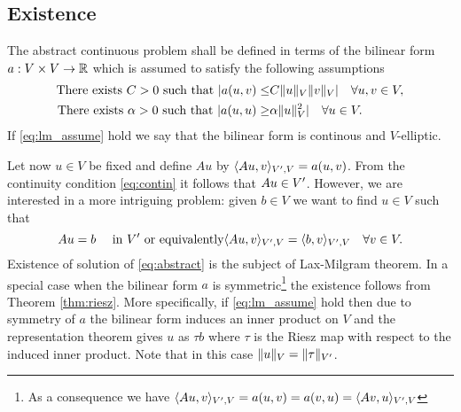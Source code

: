 \subsection{Existence}
  The abstract continuous problem shall be defined in terms of the bilinear form
  $a:V\times V\rightarrow \mathbb{R}$ which is assumed to satisfy the following
  assumptions
  \begin{subequations}\label{eq:lm_assume}
  \begin{align}
    \label{eq:contin}
    \mbox{There exists } C > 0 \mbox{ such that } \lvert a(u, v)\leq &C\lVert u\rVert_V\lVert v\rVert_V\rvert
    \quad\forall u, v\in V, \\
    \label{eq:coerc}
    \mbox{There exists }\alpha > 0 \mbox{ such that } \lvert a(u, u)\geq &\alpha\lVert u\rVert^2_V\rvert
    \quad\forall u\in V.
  \end{align}
  \end{subequations}
  If \eqref{eq:lm_assume} hold we say that the bilinear form is continous and
  $V$-elliptic.

  Let now $u\in V$ be fixed and define $Au$ by $\langle Au, v\rangle_{V^{\prime}, V}=a(u, v)$. 
  From the continuity condition \eqref{eq:contin} it follows that
  $Au\in V^{\prime}$. However, we are interested in a more intriguing problem: given
  $b\in V$ we want to find $u\in V$ such that
  \begin{equation}\label{eq:abstract}
    Au = b\quad\mbox{ in }V^{\prime}
    \mbox{ or equivalently}
    \langle Au, v\rangle_{V^{\prime}, V} = \langle b, v\rangle_{V^{\prime}, V}\quad\forall v\in V.
  \end{equation}
  Existence of solution of \eqref{eq:abstract} is the subject of Lax-Milgram
  theorem. In a special case when the bilinear form $a$ is symmetric\footnote{As a
  consequence we have 
  $\langle Au, v\rangle_{V^{\prime}, V}=a(u, v)=a(v, u) = \langle Av, u\rangle_{V^{\prime}, V}$} the
  existence follows from Theorem \ref{thm:riesz}. More specifically, if
  \eqref{eq:lm_assume} hold then due to symmetry of $a$ the bilinear form induces
  an inner product on $V$ and the representation theorem gives $u$ as $\tau b$
  where $\tau$ is the Riesz map with respect to the induced inner product. Note
  that in this case $\lVert u\rVert_{V}=\lVert\tau\rVert_{V^{\prime}}$.

